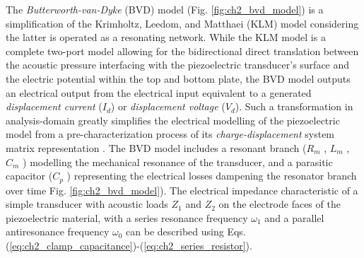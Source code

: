 The \emph{Butterworth-van-Dyke} (BVD) model \cite{VanDyke1928poti} (Fig. \ref{fig:ch2_bvd_model}) is a simplification of the 
Krimholtz, Leedom, and Matthaei (KLM) model \cite{Leedom1971itosau} considering the latter is operated as 
a resonating network. While the KLM model is a complete two-port model allowing for the bidirectional 
direct translation between the 
acoustic pressure interfacing with the piezoelectric transducer's surface and the electric potential within 
the top and bottom plate, the BVD model outputs an electrical output from the electrical input 
equivalent to a generated \emph{displacement current} ($I_d$) or \emph{displacement voltage} ($V_d$).
Such a transformation in analysis-domain greatly simplifies the electrical modelling 
of the piezoelectric model from a pre-characterization process of its \emph{charge-displacement} 
system matrix representation \cite{Szabo2014duiioTransducers}. The BVD model includes a resonant 
branch ($R_m$ , $L_m$ , $C_m$ ) modelling the mechanical resonance of the transducer, and a parasitic capacitor 
($C_p$ ) representing the electrical losses dampening the resonator branch over time Fig. \ref{fig:ch2_bvd_model}). The electrical impedance characteristic of a simple transducer
with acoustic loads $Z_1$ and $Z_2$ on the electrode faces of the piezoelectric material, with a series resonance frequency $\omega_1$ and a parallel antiresonance frequency $\omega_0$ can be described using Eqs. (\ref{eq:ch2_clamp_capacitance})-(\ref{eq:ch2_series_resistor}).


